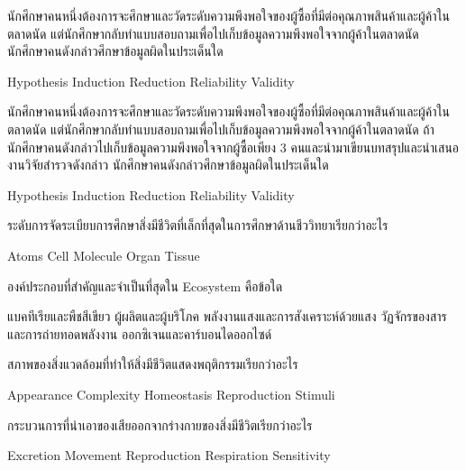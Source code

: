 \begin{questions}
\filbreak
  \question นักศึกษาคนหนึ่งต้องการจะศึกษาและวัดระดับความพึงพอใจของผู้ซื้อที่มีต่อคุณภาพสินค้าและผู้ค้าในตลาดนัด แต่นักศึกษากลับทำแบบสอบถามเพื่อไปเก็บข้อมูลความพึงพอใจจากผู้ค้าในตลาดนัด นักศึกษาคนดังกล่าวศึกษาข้อมูลผิดในประเด็นใด
  \begin{choices}
    \choice Hypothesis
    \choice Induction
    \choice Reduction
    \choice Reliability
    \choice Validity
\end{choices}

\filbreak
  \question นักศึกษาคนหนึ่งต้องการจะศึกษาและวัดระดับความพึงพอใจของผู้ซื้อที่มีต่อคุณภาพสินค้าและผู้ค้าในตลาดนัด แต่นักศึกษากลับทำแบบสอบถามเพื่อไปเก็บข้อมูลความพึงพอใจจากผู้ค้าในตลาดนัด ถ้านักศึกษาคนดังกล่าวไปเก็บข้อมูลความพึงพอใจจากผู้ซื้อเพียง 3 คนและนำมาเขียนบทสรุปและนำเสนอ งานวิจัยสำรวจดังกล่าว นักศึกษาคนดังกล่าวศึกษาข้อมูลผิดในประเด็นใด
  \begin{choices}
    \choice Hypothesis
    \choice Induction
    \choice Reduction
    \choice Reliability
    \choice Validity
\end{choices}

\filbreak
  \question ระดับการจัดระเบียบการศึกษาสิ่งมีชีวิตที่เล็กที่สุดในการศึกษาด้านชีววิทยาเรียกว่าอะไร
  \begin{choices}
    \choice Atoms
    \choice Cell
    \choice Molecule
    \choice Organ
    \choice Tissue
\end{choices}

\filbreak
  \question องค์ประกอบที่สำคัญและจำเป็นที่สุดใน Ecosystem คือข้อใด
  \begin{choices}
    \choice แบคทีเรียและพืชสีเขียว
    \choice ผู้ผลิตและผู้บริโภค
    \choice พลังงานแสงและการสังเคราะห์ด้วยแสง
    \choice วัฏจักรของสารและการถ่ายทอดพลังงาน
    \choice ออกซิเจนและคาร์บอนไดออกไซด์
\end{choices}

\filbreak
  \question สภาพของสิ่งแวดล้อมที่ทำให้สิ่งมีชีวิตแสดงพฤติกรรมเรียกว่าอะไร
  \begin{choices}
    \choice Appearance
    \choice Complexity
    \choice Homeostasis
    \choice Reproduction
    \choice Stimuli
\end{choices}

\filbreak
  \question กระบวนการที่นำเอาของเสียออกจากร่างกายของสิ่งมีชีวิตเรียกว่าอะไร
  \begin{choices}
    \choice Excretion
    \choice Movement
    \choice Reproduction
    \choice Respiration
    \choice Sensitivity
\end{choices}


\end{questions}
